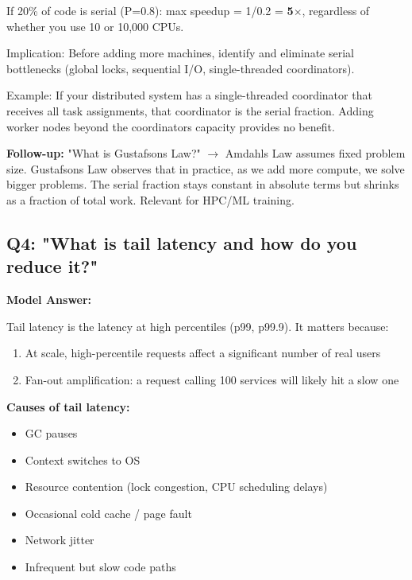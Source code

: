 \documentclass[11pt]{article}
\providecommand{\tightlist}{\setlength{\itemsep}{1pt}\setlength{\parskip}{0pt}}
\begin{document}
If 20\% of code is serial (P=0.8): max speedup = 1/0.2 = \textbf{5\(\times\)}, regardless of whether you use 10 or 10,000 CPUs.

Implication: Before adding more machines, identify and eliminate serial bottlenecks (global locks, sequential I/O, single-threaded coordinators).

Example: If your distributed system has a single-threaded coordinator that receives all task assignments, that coordinator is the serial fraction. Adding worker nodes beyond the coordinator\textquotesingle s capacity provides no benefit.

\textbf{Follow-up:} "What is Gustafson\textquotesingle s Law?"
\(\rightarrow\) Amdahl\textquotesingle s Law assumes fixed problem size. Gustafson\textquotesingle s Law observes that in practice, as we add more compute, we solve bigger problems. The serial fraction stays constant in absolute terms but shrinks as a fraction of total work. Relevant for HPC/ML training.

\subsection{Q4: "What is tail latency and how do you reduce it?"}\label{q4-what-is-tail-latency-and-how-do-you-reduce-it}

\textbf{Model Answer:}

Tail latency is the latency at high percentiles (p99, p99.9). It matters because:

\begin{enumerate}
\def\labelenumi{\arabic{enumi}.}
\tightlist
\item
  At scale, high-percentile requests affect a significant number of real users
\item
  Fan-out amplification: a request calling 100 services will likely hit a slow one
\end{enumerate}

\textbf{Causes of tail latency:}

\begin{itemize}
\tightlist
\item
  GC pauses
\item
  Context switches to OS
\item
  Resource contention (lock congestion, CPU scheduling delays)
\item
  Occasional cold cache / page fault
\item
  Network jitter
\item
  Infrequent but slow code paths
\end{itemize}
\end{document}
